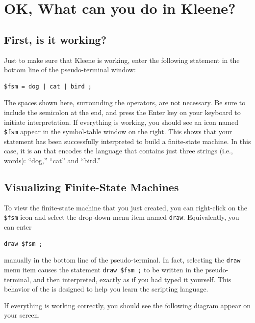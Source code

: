 \section{OK, What can you do in Kleene?}

\subsection{First, is it working?}

Just to make sure that Kleene is working, enter the following statement in the bottom line of the
pseudo-terminal window:

\begin{Verbatim}
$fsm = dog | cat | bird ;
\end{Verbatim}

\noindent
The spaces shown here, surrounding the operators, are not necessary.
Be sure to include the semicolon at the end, and press the Enter key on your keyboard to
initiate interpretation.  If everything is working, you should see an icon named
\verb!$fsm!
appear in the symbol-table window on the right.  This shows that 
your statement has 
been successfully interpreted to
build a finite-state machine.  In this case, it is an \fsm{} that encodes the
language that contains just three strings (i.e., words):  ``dog,'' ``cat'' and ``bird.''

\subsection{Visualizing Finite-State Machines}

To view the finite-state machine that you just created, you can right-click on the \verb!$fsm! icon and
select the drop-down-menu item
named \texttt{draw}.  Equivalently, you can enter 


\begin{Verbatim}
draw $fsm ;
\end{Verbatim}

\noindent
manually in the bottom line of the pseudo-terminal.  In fact, selecting the \texttt{draw} menu
item causes the statement \verb!draw $fsm ;! to be written in the
pseudo-terminal, and then interpreted, exactly as if you had typed it yourself.  This
behavior of the  is designed to help you learn the scripting language.

If everything is working correctly, you should see the following \fsm{}
diagram appear on your screen.



